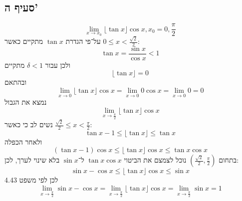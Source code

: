 \documentclass[a4paper]{article}
\begin{document}
\subsection{סעיף ה'}
\[
	\lim_{x \to x_0} \lfloor \tan x \rfloor \cos x, x_0 = 0, \frac{\pi}{2}
\]
על־פי הגדרת $\tan x$ מתקיים כאשר $0 \le x < \frac{\sqrt 2}{2}$:
\[
	\tan x = \frac{\sin x}{\cos x} < 1
\]
ולכן עבור $\delta < 1$ מתקיים
\[
	\lfloor \tan x \rfloor = 0
\]
ובהתאם
\[
	\lim_{x \to 0} \lfloor \tan x \rfloor \cos x
	= \lim_{x \to 0} 0 \cos x
	= \lim_{x \to 0} 0
	= 0
\]
נמצא את הגבול
\[
	\lim_{x \to \frac{\pi}{2}} \lfloor \tan x \rfloor \cos x
\]
נשים לב כי כאשר $\frac{\sqrt{2}}{2} \le x < \frac{\pi}{2}$:
\[
	\tan x - 1 \le \lfloor \tan x \rfloor \le \tan x 
\]
ולאחר הכפלה
\[
	(\tan x - 1) \cos x \le \lfloor \tan x \rfloor \cos x \le \tan x \cos x
\]
בתחום $(\frac{\sqrt{2}}{2}, \frac{\pi}{2})$ נוכל לצמצם את הביטוי $\tan x \cos x$ ל־$\sin x$ בלא שינוי לערך, לכן:
\[
	\sin x - \cos x \le \lfloor \tan x \rfloor \cos x \le \sin x
\]
לכן לפי משפט 4.43
\[
	\lim_{x \to \frac{\pi}{2}} \sin x - \cos x = \lim_{x \to \frac{\pi}{2}} \lfloor \tan x \rfloor \cos x = \lim_{x \to \frac{\pi}{2}} \sin x = 1
\]
\end{document}

